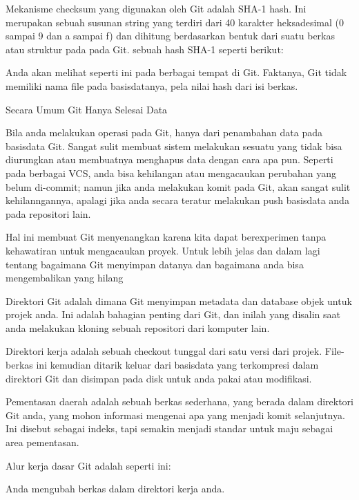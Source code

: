 \vspace{12pt}
\noindent 
Mekanisme checksum yang digunakan oleh Git adalah SHA-1 hash. Ini merupakan sebuah susunan string yang terdiri dari 40 karakter heksadesimal (0 sampai 9 dan a sampai f) dan dihitung berdasarkan bentuk dari suatu berkas atau struktur pada pada Git. sebuah hash SHA-1 seperti berikut: \par
\noindent 
Anda akan melihat seperti ini pada berbagai tempat di Git. Faktanya, Git tidak memiliki nama file pada basisdatanya, pela nilai hash dari isi berkas. \par
\vspace{12pt}
\noindent 
Secara Umum Git Hanya Selesai Data \par
\noindent 
Bila anda melakukan operasi pada Git, hanya dari penambahan data pada basisdata Git. Sangat sulit membuat sistem melakukan sesuatu yang tidak bisa diurungkan atau membuatnya menghapus data dengan cara apa pun. Seperti pada berbagai VCS, anda bisa kehilangan atau mengacaukan perubahan yang belum di-commit; namun jika anda melakukan komit pada Git, akan sangat sulit kehilanngannya, apalagi jika anda secara teratur melakukan push basisdata anda pada repositori lain. \par
\noindent 
Hal ini membuat Git menyenangkan karena kita dapat berexperimen tanpa kehawatiran untuk mengacaukan proyek. Untuk lebih jelas dan dalam lagi tentang bagaimana Git menyimpan datanya dan bagaimana anda bisa mengembalikan yang hilang \par
\noindent 
Direktori Git adalah dimana Git menyimpan metadata dan database objek untuk projek anda. Ini adalah bahagian penting dari Git, dan inilah yang disalin saat anda melakukan kloning sebuah repositori dari komputer lain. \par
\noindent 
Direktori kerja adalah sebuah checkout tunggal dari satu versi dari projek. File-berkas ini kemudian ditarik keluar dari basisdata yang terkompresi dalam direktori Git dan disimpan pada disk untuk anda pakai atau modifikasi. \par
\vspace{12pt}
\noindent 
Pementasan daerah adalah sebuah berkas sederhana, yang berada dalam direktori Git anda, yang mohon informasi mengenai apa yang menjadi komit selanjutnya. Ini disebut sebagai indeks, tapi semakin menjadi standar untuk maju sebagai area pementasan. \par
\noindent 
Alur kerja dasar Git adalah seperti ini: \par
\noindent 
Anda mengubah berkas dalam direktori kerja anda. \par
